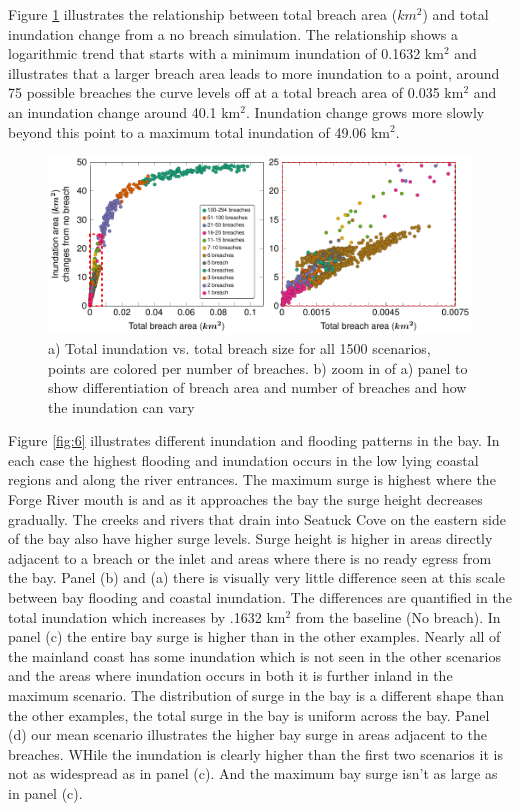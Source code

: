 \documentclass{coastal_paper}
\begin{document}
Figure \ref{fig:5} illustrates the relationship between total breach area ($km^2$) and total inundation change from a no breach simulation. The relationship shows a logarithmic trend that starts with a minimum inundation of 0.1632 km$^2$ and illustrates that a larger breach area leads to more inundation to a point, around 75 possible breaches the curve levels off at a total breach area of 0.035 km$^2$ and an inundation change around 40.1 km$^2$. Inundation change grows more slowly beyond this point to a maximum total inundation of 49.06 km$^2$.

\begin{figure}[ht]
    \centering
    \includegraphics[width=\textwidth]{figures/fig5_v2.pdf}
    \caption{a) Total inundation vs. total breach size for all 1500 scenarios, points are colored per number of breaches. b) zoom in of a) panel to show differentiation of breach area and number of breaches and how the inundation can vary}
    \label{fig:5}
\end{figure}

Figure \ref{fig:6} illustrates different inundation and flooding patterns in the bay. In each case the highest flooding and inundation occurs in the low lying coastal regions and along the river entrances. The maximum surge is highest where the Forge River mouth is and as it approaches the bay the surge height decreases gradually. The creeks and rivers that drain into Seatuck Cove on the eastern side of the bay also have higher surge levels. Surge height is higher in areas directly adjacent to a breach or the inlet and areas where there is no ready egress from the bay. Panel (b) and (a) there is visually very little difference seen at this scale between bay flooding and coastal inundation. The differences are quantified in the total inundation which increases by .1632 km$^2$ from the baseline (No breach). In panel (c) the entire bay surge is higher than in the other examples. Nearly all of the mainland coast has some inundation which is not seen in the other scenarios and the areas where inundation occurs in both it is further inland in the maximum scenario. The distribution of surge in the bay is a different shape than the other examples, the total surge in the bay is uniform across the bay. Panel (d) our mean scenario illustrates the higher bay surge in areas adjacent to the breaches. WHile the inundation is clearly higher than the first two scenarios it is not as widespread as in panel (c). And the maximum bay surge isn't as large as in panel (c).
\end{document}
